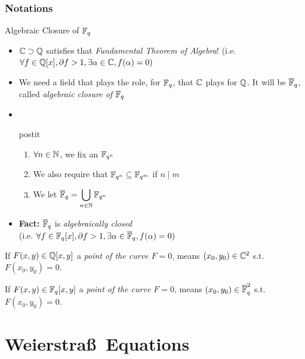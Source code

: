 \documentclass[10pt,handout]{beamer} %
\begin{document}
\begin{frame}[label=current]
\frametitle{Notations}
%
 \begin{block}{Algebraic Closure of $\mathbb F_q$}\pause
 \begin{itemize}[<+-| alert@+>] %
  \item $\mathbb C\supset\mathbb Q$ satisfies that \emph{Fundamental Theorem of Algebra}! (i.e. $\forall f\in\mathbb Q[x], \partial f>1, \exists\alpha\in\mathbb C,
 f(\alpha)=0)$
  \item We need a field that plays the role, for $\mathbb F_q$, that $\mathbb C$ plays for $\mathbb Q$. It will be $\overline{\mathbb F}_q$, called
\emph{algebraic closure of $\mathbb F_q$}
 \item  \ \\
 \begin{beamercolorbox}[rounded=true,shadow=true,wd=7.5cm,center]{postit}
         \begin{enumerate}
          \item $\forall n\in\mathbb N$, we fix an $\mathbb F_{q^n}$
          \item We also require that $\mathbb F_{q^n}\subseteq\mathbb F_{q^m}$ if $n\mid m$
          \item We let $\overline{\mathbb F}_q=\displaystyle\bigcup_{n\in\mathbb N}\mathbb F_{q^n}$
         \end{enumerate}
\end{beamercolorbox}
 \item
  \textbf{Fact:} $\overline{\mathbb F}_q$ is \emph{algebraically closed}\\ (i.e. $\forall f\in\mathbb F_q[x], \partial f>1, \exists\alpha\in\overline{\mathbb F}_q,
 f(\alpha)=0)$
 \end{itemize}
 \end{block}

\begin{scriptsize}
If $F(x,y)\in\mathbb Q[x,y]$ a \emph{point of the curve $F=0$}, means $(x_0,y_0)\in\mathbb C^2$ s.t.
$F(x_0,y_0)=0$. \pause

If $F(x,y)\in\mathbb F_q[x,y]$ a \emph{point of the curve $F=0$}, means $(x_0,y_0)\in\overline{\mathbb F}_q^2$ s.t.
$F(x_0,y_0)=0$.
\end{scriptsize}\end{frame}


\section{Weierstra\ss\ Equations}
\end{document}
